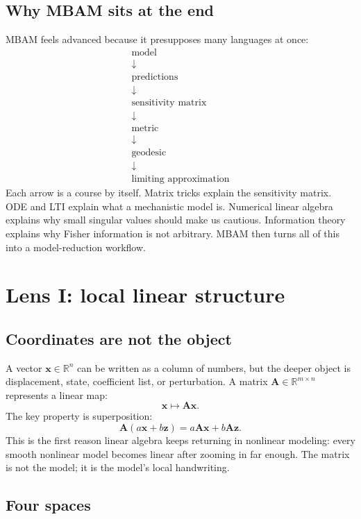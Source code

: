 \documentclass[a4paper]{article}
\newcommand{\R}{\mathbb{R}}
\newcommand{\mat}[1]{\mathbf{#1}}
\newcommand{\vect}[1]{\mathbf{#1}}
\begin{document}
\subsection{Why MBAM sits at the end}

MBAM feels advanced because it presupposes many languages at once:
\[
  \begin{array}{c}
    \text{model}\\
    \downarrow\\
    \text{predictions}\\
    \downarrow\\
    \text{sensitivity matrix}\\
    \downarrow\\
    \text{metric}\\
    \downarrow\\
    \text{geodesic}\\
    \downarrow\\
    \text{limiting approximation}
  \end{array}
\]
Each arrow is a course by itself.  Matrix tricks explain the sensitivity matrix.  ODE and LTI explain what a mechanistic model is.  Numerical linear algebra explains why small singular values should make us cautious.  Information theory explains why Fisher information is not arbitrary.  MBAM then turns all of this into a model-reduction workflow.

\section{Lens I: local linear structure}

\subsection{Coordinates are not the object}

A vector \(\vect{x}\in\R^n\) can be written as a column of numbers, but the deeper object is displacement, state, coefficient list, or perturbation.  A matrix \(\mat{A}\in\R^{m\times n}\) represents a linear map:
\[
  \vect{x}\mapsto \mat{A}\vect{x}.
\]
The key property is superposition:
\[
  \mat{A}(a\vect{x}+b\vect{z})
  =
  a\mat{A}\vect{x}+b\mat{A}\vect{z}.
\]
This is the first reason linear algebra keeps returning in nonlinear modeling: every smooth nonlinear model becomes linear after zooming in far enough.  The matrix is not the model; it is the model's local handwriting.

\subsection{Four spaces}
\end{document}
